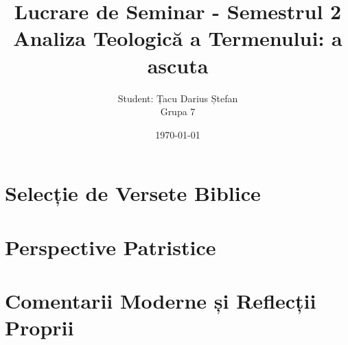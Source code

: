 \documentclass[12pt,a4paper]{article}
\title{Lucrare de Seminar - Semestrul 2 \\ [0.5ex] \large Analiza Teologică a Termenului: a ascuta}
\author{Student: Țacu Darius Ștefan \\ Grupa 7}
\date{\today}
\begin{document}
\maketitle

\tableofcontents
\newpage

\section{Selecție de Versete Biblice}


\section{Perspective Patristice}


\section{Comentarii Moderne și Reflecții Proprii}


\newpage
\printbibliography[title={Bibliografie}]
\end{document}
